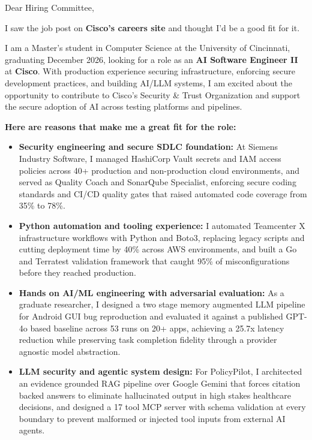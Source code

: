 \documentclass[11pt]{letter}
\date{}
\begin{document}
\begin{letter}{}

\opening{Dear Hiring Committee,}

I saw the job post on \textbf{Cisco's careers site} and thought I'd be a good fit for it.

I am a Master's student in Computer Science at the University of Cincinnati, graduating December 2026, looking for a role as an \textbf{AI Software Engineer II} at \textbf{Cisco}. With production experience securing infrastructure, enforcing secure development practices, and building AI/LLM systems, I am excited about the opportunity to contribute to Cisco's Security \& Trust Organization and support the secure adoption of AI across testing platforms and pipelines.

\textbf{Here are reasons that make me a great fit for the role:}

\begin{itemize}[leftmargin=*, itemsep=0.45em]
    \item \textbf{Security engineering and secure SDLC foundation:} At Siemens Industry Software, I managed HashiCorp Vault secrets and IAM access policies across 40+ production and non-production cloud environments, and served as Quality Coach and SonarQube Specialist, enforcing secure coding standards and CI/CD quality gates that raised automated code coverage from 35\% to 78\%.

    \item \textbf{Python automation and tooling experience:} I automated Teamcenter X infrastructure workflows with Python and Boto3, replacing legacy scripts and cutting deployment time by 40\% across AWS environments, and built a Go and Terratest validation framework that caught 95\% of misconfigurations before they reached production.

    \item \textbf{Hands on AI/ML engineering with adversarial evaluation:} As a graduate researcher, I designed a two stage memory augmented LLM pipeline for Android GUI bug reproduction and evaluated it against a published GPT-4o based baseline across 53 runs on 20+ apps, achieving a 25.7x latency reduction while preserving task completion fidelity through a provider agnostic model abstraction.

    \item \textbf{LLM security and agentic system design:} For PolicyPilot, I architected an evidence grounded RAG pipeline over Google Gemini that forces citation backed answers to eliminate hallucinated output in high stakes healthcare decisions, and designed a 17 tool MCP server with schema validation at every boundary to prevent malformed or injected tool inputs from external AI agents.


\end{itemize}
\end{letter}
\end{document}
